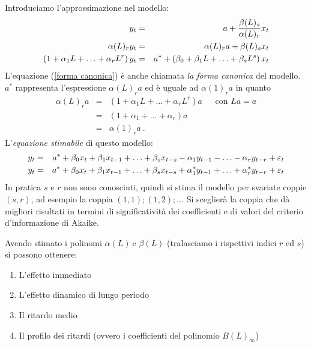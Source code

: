 \documentclass[a4paper]{report}
\newcounter{ese}
\theoremstyle{remark}
\begin{document}
\noindent Introduciamo l'approssimazione nel modello:%
\begin{eqnarray}
y_{t} &=&a+\frac{\beta (L)_{s}}{\alpha (L)_{r}}x_{t}  \notag \\
\alpha (L)_{r}y_{t} &=&\alpha (L)_{r}a+\beta (L)_{s}x_{t}
\label{formulazone partenza} \\
\left( 1+\alpha _{1}L+\ldots +\alpha _{r}L^{r}\right) y_{t} &=&a^{\ast
}+\left( \beta _{0}+\beta _{1}L+\ldots +\beta _{s}L^{s}\right) x_{t}
\label{forma canonica}
\end{eqnarray}%
L'equazione (\ref{forma canonica}) \`{e} anche chiamata \emph{la forma
canonica} del modello. $a^{\ast }$ rappresenta l'espressione $\alpha
(L)_{r}a $ ed \`{e} uguale ad $\alpha (1)_{r}a$ in quanto 
\begin{eqnarray*}
\alpha (L)_{r}a &=&\left( 1+\alpha _{1}L+\ldots +\alpha _{r}L^{r}\right) a\
\ \ \ \ \ \ \text{con }La=a \\
&=&\left( 1+\alpha _{1}+\ldots +\alpha _{r}\right) a \\
&=&\alpha (1)_{r}a\ .
\end{eqnarray*}%
L'\emph{equazione stimabile} di questo modello:%
\begin{eqnarray}
y_{t} &=&a^{\ast }+\beta _{0}x_{t}+\beta _{1}x_{t-1}+\ldots +\beta
_{s}x_{t-s}-\alpha _{1}y_{t-1}-\ldots -\alpha _{r}y_{t-r}+\varepsilon _{t} 
\notag \\
y_{t} &=&a^{\ast }+\beta _{0}x_{t}+\beta _{1}x_{t-1}+\ldots +\beta
_{s}x_{t-s}+\alpha _{1}^{\ast }y_{t-1}+\ldots +\alpha _{r}^{\ast
}y_{t-r}+\varepsilon _{t}  \label{equazione_stimabile_jorgenson}
\end{eqnarray}%
In pratica $s$ e $r$ non sono conosciuti, quindi si stima il modello per
svariate coppie $\left( s,r\right) $, ad esempio la coppia $%
(1,1);(1,2);\ldots $ Si sceglier\`{a} la coppia che d\`{a} migliori
risultati in termini di significativit\`{a} dei coefficienti e di valori del
criterio d'informazione di Akaike.

\noindent Avendo stimato i polinomi $\alpha (L)\ $e $\beta (L)$ (tralasciamo
i rispettivi indici $r$ ed $s$) si possono ottenere:

\begin{enumerate}
\item L'effetto immediato

\item L'effetto dinamico di lungo periodo

\item Il ritardo medio

\item Il profilo dei ritardi (ovvero i coefficienti del polinomio $%
B(L)_{\infty }$)
\end{enumerate}
\end{document}
